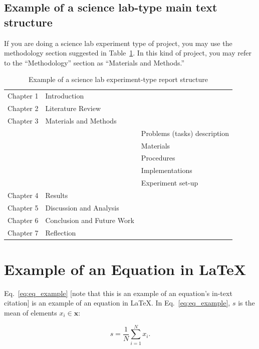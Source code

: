 \subsection{Example of a science lab-type main text structure}
If you are doing a science lab experiment type of project, you may use the  methodology section suggested in Table~\ref{tab:lab_temp}. In this kind of project, you may refer to the ``Methodology'' section as ``Materials and Methods.''
\begin{table}[!ht]
    \centering
    \caption{Example of a science lab experiment-type report structure}
    \label{tab:lab_temp}
    \begin{tabular}{lll}     
        \toprule                   
        Chapter 1 & Introduction  &    \\        
        Chapter 2 & Literature Review  &    \\                
        Chapter 3 & Materials and Methods   &    \\
        &               & Problems (tasks) description  \\
        &               & Materials \\        
        &               & Procedures  \\                
        &               & Implementations   \\
        &               & Experiment set-up   \\
        Chapter 4 & Results       &  \\
        Chapter 5 & Discussion and Analysis  &    \\
        Chapter 6 & Conclusion and Future Work  &    \\        
        Chapter 7 & Reflection  &    \\          
        \bottomrule
    \end{tabular}
\end{table}

\section{Example of an Equation in \LaTeX}
Eq.~\ref{eq:eq_example} [note that this is an example of an equation's in-text citation] is an example of an equation in \LaTeX. In Eq.~\eqref{eq:eq_example}, $ s $ is the mean of elements $ x_i \in \mathbf{x} $: 

\begin{equation}
\label{eq:eq_example} %
s = \frac{1}{N} \sum_{i = 1}^{N} x_i. 
\end{equation}

